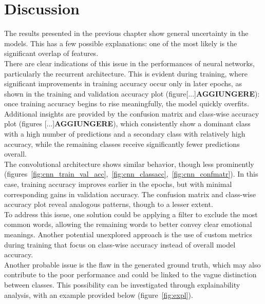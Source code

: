 \chapter*{Discussion}
\label{ch:discussion}
The results presented in the previous chapter show general
uncertainty in the models. This has a few possible explanations:
one of the most likely is the significant overlap of features.\\

There are clear indications of this issue in the performances of neural networks,
particularly the recurrent architecture. This is evident during training, where
significant improvements in training accuracy occur only in later epochs, as shown
in the training and validation accuracy plot (figure[...]\textbf{AGGIUNGERE}):
once training accuracy begins to rise meaningfully, the model quickly overfits.
Additional insights are provided by the confusion matrix and class-wise accuracy
plot (figures [...]\textbf{AGGIUNGERE}), which consistently
show a dominant class with a high number of predictions and a secondary class
with relatively high accuracy, while the remaining classes receive significantly
fewer predictions overall.\\

The convolutional architecture shows similar behavior, though less prominently
(figures~\ref{fig:cnn_train_val_acc},~\ref{fig:cnn_classacc},~\ref{fig:cnn_confmatr}).
In this case, training accuracy improves earlier in the epochs,
but with minimal corresponding gains in validation accuracy.
The confusion matrix and class-wise accuracy plot reveal analogous patterns, though
to a lesser extent.\\

To address this issue, one solution could be applying a filter to exclude the most
common words, allowing the remaining words to better convey clear emotional
meanings. Another potential unexplored approach is the use of custom
metrics during training that focus on class-wise accuracy instead of overall model
accuracy.\\

Another probable issue is the flaw in the generated ground truth, which may
also contribute to the poor performance and could be linked to the vague distinction
between classes.
This possibility can be investigated through explainability analysis, with an
example provided below (figure~\ref{fig:expl}).

